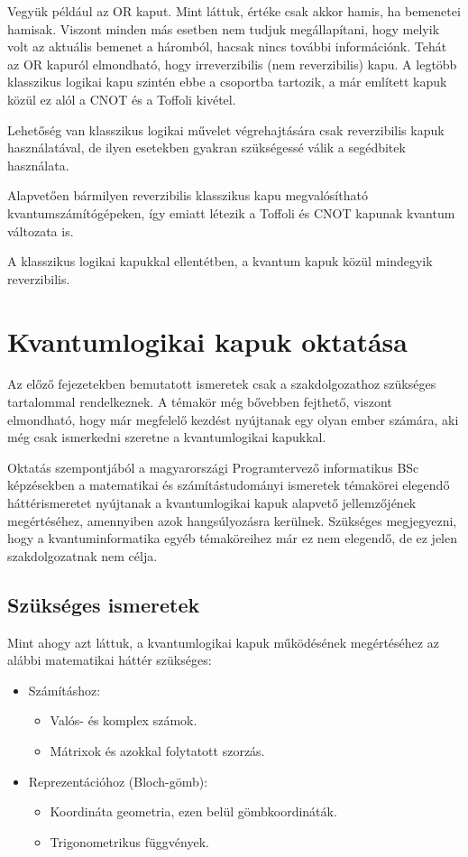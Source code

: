 \documentclass[
]{thesis-ekf}
\theoremstyle{definition}
\theoremstyle{remark}
\begin{document}
Vegyük például az OR kaput. Mint láttuk, értéke csak akkor hamis, ha bemenetei hamisak. Viszont minden más esetben nem tudjuk megállapítani, hogy melyik volt az aktuális bemenet a háromból, hacsak nincs további információnk. Tehát az OR kapuról elmondható, hogy irreverzibilis (nem reverzibilis) kapu. A legtöbb klasszikus logikai kapu szintén ebbe a csoportba tartozik, a már említett kapuk közül ez alól a CNOT és a Toffoli kivétel.\cite{Chris Bernhardt}

Lehetőség van klasszikus logikai művelet végrehajtására csak reverzibilis kapuk használatával, de ilyen esetekben gyakran szükségessé válik a segédbitek használata.

Alapvetően bármilyen reverzibilis klasszikus kapu megvalósítható kvantumszámítógépeken, így emiatt létezik a Toffoli és CNOT kapunak kvantum változata is.

A klasszikus logikai kapukkal ellentétben, a kvantum kapuk közül mindegyik reverzibilis.

\chapter{Kvantumlogikai kapuk oktatása}
Az előző fejezetekben bemutatott ismeretek csak a szakdolgozathoz szükséges tartalommal rendelkeznek. A témakör még bővebben fejthető, viszont elmondható, hogy már megfelelő kezdést nyújtanak egy olyan ember számára, aki még csak ismerkedni szeretne a kvantumlogikai kapukkal.

Oktatás szempontjából a magyarországi Programtervező informatikus BSc képzésekben a matematikai és számítástudományi ismeretek témakörei elegendő háttérismeretet nyújtanak a kvantumlogikai kapuk alapvető jellemzőjének megértéséhez, amennyiben azok hangsúlyozásra kerülnek. Szükséges megjegyezni, hogy a kvantuminformatika egyéb témaköreihez már ez nem elegendő, de ez jelen szakdolgozatnak nem célja. 
\section{Szükséges ismeretek}
Mint ahogy azt láttuk, a kvantumlogikai kapuk működésének megértéséhez az alábbi matematikai háttér szükséges:
\begin{itemize}
	\item Számításhoz:
	\begin{itemize}
		\item Valós- és komplex számok.
		\item Mátrixok és azokkal folytatott szorzás.
	\end{itemize}
	\item Reprezentációhoz (Bloch-gömb):
	\begin{itemize}
		\item Koordináta geometria, ezen belül gömbkoordináták.
		\item Trigonometrikus függvények.
	\end{itemize}
\end{itemize}
\end{document}
